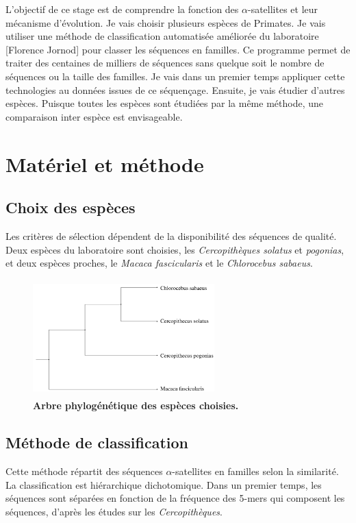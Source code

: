 \documentclass[12pt,a4paper]{article}
\begin{document}
L'objectif de ce stage est de comprendre la fonction des $\alpha$-satellites et leur mécanisme d'évolution. Je vais choisir plusieurs espèces de Primates. Je vais utiliser une méthode de classification automatisée améliorée du laboratoire [Florence Jornod] pour classer les séquences en familles.  Ce programme permet de traiter des centaines de milliers de séquences sans quelque soit le nombre de séquences ou la taille des familles. Je vais dans un premier temps appliquer cette technologies au données issues de ce séquençage. Ensuite, je vais étudier d'autres espèces. Puisque toutes les espèces sont étudiées par la  même méthode, une comparaison inter espèce est envisageable. 

\section{Matériel et méthode}
\subsection{Choix des espèces}
Les critères de sélection dépendent de la disponibilité des séquences de qualité. Deux espèces du laboratoire sont choisies, les \textit{Cercopithèques solatus} et \textit{pogonias}, et deux espèces proches, le \textit{Macaca fascicularis} et le \textit{Chlorocebus sabaeus}.  
	\begin{figure}
		\center
		\includegraphics[height=4.5cm, width=7cm]{img/arbre_especes.png}
		\caption{\textbf{Arbre phylogénétique des espèces choisies.}}
	\end{figure}

\subsection{Méthode de classification}
Cette méthode \cite{rapport_florence} répartit des séquences $\alpha$-satellites en familles selon la similarité. La classification est hiérarchique dichotomique. Dans un premier temps, les séquences sont séparées en fonction de la fréquence des 5-mers qui composent les séquences, d'après les études sur les \textit{Cercopithèques}.
\end{document}

